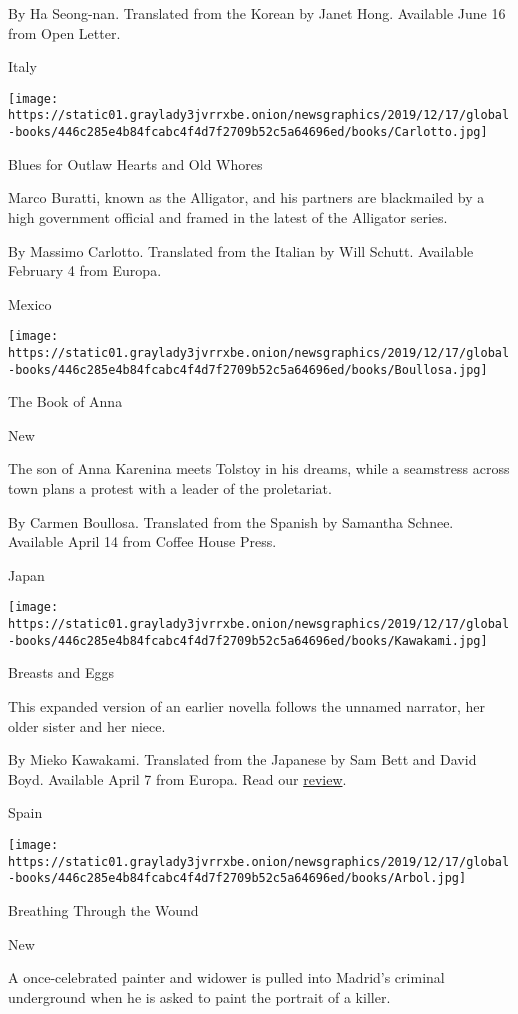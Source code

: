  By Ha Seong-nan. Translated from the Korean by Janet Hong. Available
June 16 from Open Letter.

Italy

\texttt{[image: https://static01.graylady3jvrrxbe.onion/newsgraphics/2019/12/17/global-books/446c285e4b84fcabc4f4d7f2709b52c5a64696ed/books/Carlotto.jpg]}

Blues for Outlaw Hearts and Old Whores

Marco Buratti, known as the Alligator, and his partners are blackmailed
by a high government official and framed in the latest of the Alligator
series.

 By Massimo Carlotto. Translated from the Italian by Will Schutt.
Available February 4 from Europa.

Mexico

\texttt{[image: https://static01.graylady3jvrrxbe.onion/newsgraphics/2019/12/17/global-books/446c285e4b84fcabc4f4d7f2709b52c5a64696ed/books/Boullosa.jpg]}

The Book of Anna

New

The son of Anna Karenina meets Tolstoy in his dreams, while a seamstress
across town plans a protest with a leader of the proletariat.

 By Carmen Boullosa. Translated from the Spanish by Samantha Schnee.
Available April 14 from Coffee House Press.

Japan

\texttt{[image: https://static01.graylady3jvrrxbe.onion/newsgraphics/2019/12/17/global-books/446c285e4b84fcabc4f4d7f2709b52c5a64696ed/books/Kawakami.jpg]}

Breasts and Eggs

This expanded version of an earlier novella follows the unnamed
narrator, her older sister and her niece.

 By Mieko Kawakami. Translated from the Japanese by Sam Bett and David
Boyd. Available April 7 from Europa. Read our
\href{https://www.nytimes3xbfgragh.onion/2020/04/07/books/review/breasts-and-eggs-mieko-kawakami.html}{review}.

Spain

\texttt{[image: https://static01.graylady3jvrrxbe.onion/newsgraphics/2019/12/17/global-books/446c285e4b84fcabc4f4d7f2709b52c5a64696ed/books/Arbol.jpg]}

Breathing Through the Wound

New

A once-celebrated painter and widower is pulled into Madrid's criminal
underground when he is asked to paint the portrait of a killer.

